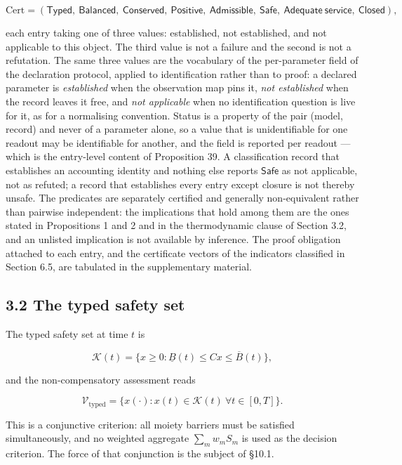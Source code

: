 \documentclass[11pt]{article}
\begin{document}
$$\mathrm{Cert}=(\mathsf{Typed},\ \mathsf{Balanced},\ \mathsf{Conserved},\ \mathsf{Positive},\ \mathsf{Admissible},\ \mathsf{Safe},\ \mathsf{Adequate\ service},\ \mathsf{Closed}),$$

 each entry taking one of three values: established, not established, and not applicable to this object. The third value is not a failure and the second is not a refutation. The same three values are the vocabulary of the per-parameter field of the declaration protocol, applied to identification rather than to proof: a declared parameter is \emph{established} when the observation map pins it, \emph{not established} when the record leaves it free, and \emph{not applicable} when no identification question is live for it, as for a normalising convention. Status is a property of the pair (model, record) and never of a parameter alone, so a value that is unidentifiable for one readout may be identifiable for another, and the field is reported per readout --- which is the entry-level content of Proposition 39. A classification record that establishes an accounting identity and nothing else reports \(\mathsf{Safe}\) as not applicable, not as refuted; a record that establishes every entry except closure is not thereby unsafe. The predicates are separately certified and generally non-equivalent rather than pairwise independent: the implications that hold among them are the ones stated in Propositions 1 and 2 and in the thermodynamic clause of Section 3.2, and an unlisted implication is not available by inference. The proof obligation attached to each entry, and the certificate vectors of the indicators classified in Section 6.5, are tabulated in the supplementary material.

\subsection*{3.2 The typed safety set}\label{32-the-typed-safety-set}

The typed safety set at time \(t\) is 

$$\mathcal{K}(t) = \{ x \ge 0 : \underline{B}(t) \le Cx \le \overline{B}(t) \},$$

 and the non-compensatory assessment reads 

$$\mathcal{V}_{\mathrm{typed}} = \{ x(\cdot) : x(t) \in \mathcal{K}(t)\ \forall t \in [0,T] \}.$$

 This is a conjunctive criterion: all moiety barriers must be satisfied simultaneously, and no weighted aggregate \(\sum_m w_m S_m\) is used as the decision criterion. The force of that conjunction is the subject of \S10.1.
\end{document}
